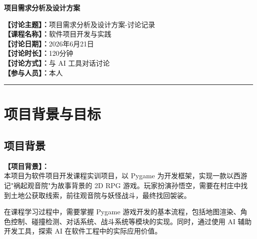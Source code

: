 \documentclass[12pt,a4paper]{article}
\begin{document}
\begin{center}
    {\LARGE\bfseries 项目需求分析及设计方案}\\[1cm]
\end{center}

\noindent
\textbf{【讨论主题】：}项目需求分析及设计方案-讨论记录\\[6pt]
\textbf{【课程名称】：}软件项目开发与实践\\[6pt]
\textbf{【讨论日期】：}2026年6月21日\\[6pt]
\textbf{【讨论时长】：}120分钟\\[6pt]
\textbf{【讨论方式】：}与 AI 工具对话讨论\\[6pt]
\textbf{【参与人员】：}本人\\[12pt]

\rule{\textwidth}{0.8pt}

\section{项目背景与目标}

\subsection{项目背景}
\textbf{【项目背景】：}\\[4pt]
\indent 本项目为软件项目开发课程实训项目，以 Pygame 为开发框架，实现一款以西游记"祸起观音院"为故事背景的 2D RPG 游戏。玩家扮演孙悟空，需要在村庄中找到土地公获取线索，前往观音院与妖怪战斗，最终找回袈裟。

在课程学习过程中，需要掌握 Pygame 游戏开发的基本流程，包括地图渲染、角色控制、碰撞检测、对话系统、战斗系统等模块的实现。同时，通过使用 AI 辅助开发工具，探索 AI 在软件工程中的实际应用价值。
\end{document}
